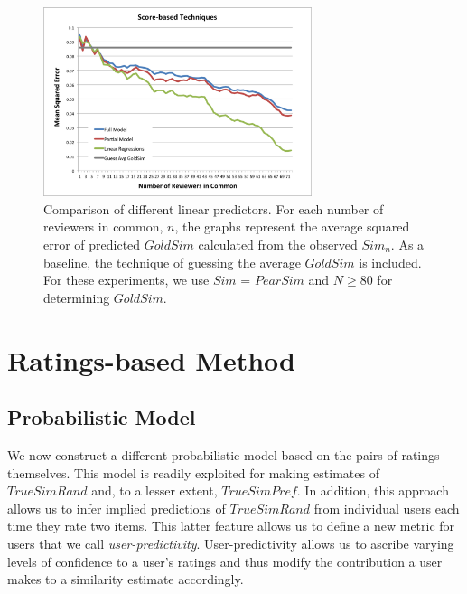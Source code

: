 \documentclass[11pt]{article}
\begin{document}
\begin{figure}[!htbp]
    \centering
    \includegraphics[width=0.7\textwidth]{LinearTechniques.png}
	\caption{Comparison of different linear predictors. For each number of
reviewers in common, $n$, the graphs represent the average squared error of
predicted $GoldSim$ calculated from the observed $Sim_n$. As a baseline, the
technique of guessing the average $GoldSim$ is included. For these experiments,
we use $Sim$ = $PearSim$ and $N \geq 80$ for determining $GoldSim$.}
    \label{fig:Linear}
\end{figure}


\section*{Ratings-based Method}
\subsection*{Probabilistic Model}

We now construct a different probabilistic model based on the pairs of ratings
themselves. This model is readily exploited for making estimates of
$TrueSimRand$ and, to a lesser extent, $TrueSimPref$. In addition, this approach
allows us to infer implied predictions of $TrueSimRand$ from individual users 
each time they rate two items. This latter feature allows us to define a new 
metric for users that we call {\em user-predictivity}. User-predictivity allows
us to ascribe varying levels of confidence to a user's ratings and thus modify
the contribution a user makes to a similarity estimate accordingly.
\end{document}
